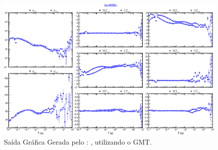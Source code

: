         \begin{figure}[H]
            \caption{Saída Gráfica Gerada pelo : , utilizando o GMT.}
                \begin{center}
                    \includegraphics[width=15cm]{texto/figura/plot-cmp-tf.png}
                \end{center}
            \label{plot-cmp-tf}
        \end{figure}

    

    
